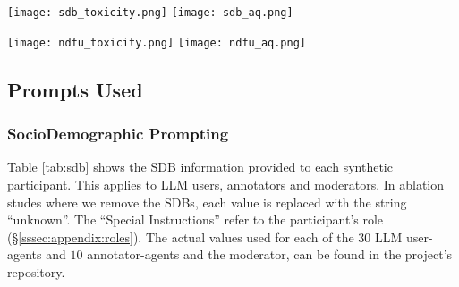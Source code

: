 \begin{figure*}[t]
    \texttt{[image: sdb\_toxicity.png]} \hfill
    \texttt{[image: sdb\_aq.png]}
	\centering
	\caption{Distribution plot of inter-annotator polarization (\ac{nDFU}) for each comment in all synthetic discussions following the "No Instructions" strategy and using the Qwen 2.5 model. The blue (left-most) bars represent the disagreement between $10$ identical annotator-agents, while the orange (right-most) bars, the disagreement between $10$ annotators with different \acp{SDB}.}
    \label{fig:sdb_annot}
\end{figure*}

\begin{figure*}[t]
    \texttt{[image: ndfu\_toxicity.png]} \hfill
    \texttt{[image: ndfu\_aq.png]}
	\centering
	\caption{Inter-annotator polarization (\ac{nDFU}) of each synthetic comment for all synthetic discussions, by annotation level. The left graph shows the relationship between $nDFU_{toxicity}$ and toxicity, while the right graph shows the relationship between $nDFU_{arg\_quality}$ and \ac{AQ}.}
    \label{fig:ndfu_annot}
\end{figure*}



\subsection{Prompts Used}
\label{ssec:appendix:prompts}


\subsubsection{SocioDemographic Prompting}
\label{sssec:appendix:sdbs}

Table \ref{tab:sdb} shows the \ac{SDB} information provided to each synthetic participant. This applies to \ac{LLM} users, annotators and moderators. In ablation studes where we remove the \acp{SDB}, each value is replaced with the string “unknown”. The “Special Instructions” refer to the participant's role (\S\ref{sssec:appendix:roles}). The actual values used for each of the $30$ \ac{LLM} user-agents and $10$ annotator-agents and the moderator, can be found in the project's repository\analysislink.

